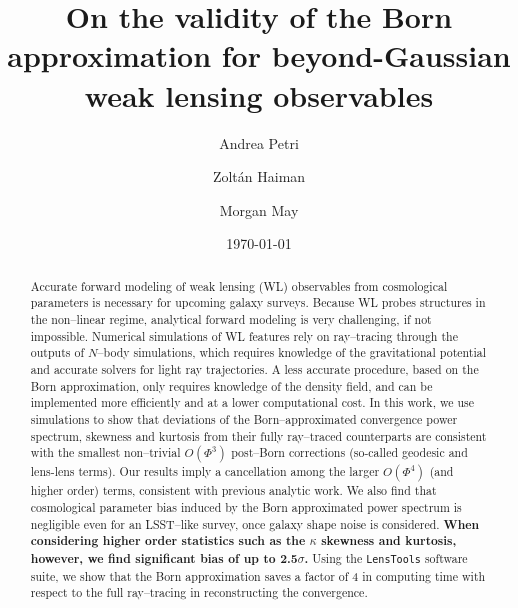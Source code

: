 \documentclass[reprint,aps,prd,superscriptaddress,showkeys,showpacs]{revtex4-1}
\newcommand{\ttt}[1]{\texttt{#1}}
\begin{document}
\title{On the validity of the Born approximation for beyond-Gaussian weak lensing observables}

\author{Andrea Petri}

\author{Zolt\'an Haiman}

\author{Morgan May}

\date{\today}

\label{firstpage}

\begin{abstract}
Accurate forward modeling of weak lensing (WL) observables from cosmological parameters is necessary for upcoming galaxy surveys. Because WL probes structures in the non--linear regime, analytical forward modeling is very challenging, if not impossible. Numerical simulations of WL features rely on ray--tracing through the outputs of $N$--body simulations, which requires knowledge of the gravitational potential and accurate solvers for light ray trajectories. A less accurate procedure, based on the Born approximation, only requires knowledge of the density field, and can be implemented more efficiently and at a lower computational cost. In this work, we use simulations to show that deviations of the Born--approximated convergence power spectrum, skewness and kurtosis from their fully ray--traced counterparts are consistent with the smallest non--trivial $O(\Phi^3)$ post--Born corrections (so-called geodesic and lens-lens terms). Our results imply a cancellation among the larger $O(\Phi^4)$ (and higher order) terms, consistent with previous analytic work. We also find that cosmological parameter bias induced by the Born approximated power spectrum is negligible even for an LSST--like survey, once galaxy shape noise is considered. \textbf{\color{red} When considering higher order statistics such as the $\kappa$ skewness and kurtosis, however, we find significant bias of up to 2.5$\sigma$.} Using the \ttt{LensTools} software suite, we show that the Born approximation saves a factor of 4 in computing time with respect to the full ray--tracing in reconstructing the convergence.       
\end{abstract}
\end{document}
